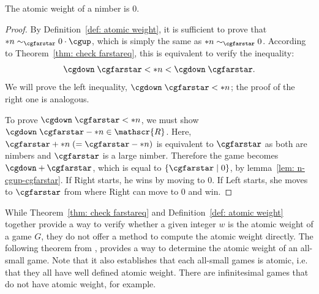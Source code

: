 \documentclass[oneside,reqno]{amsart}
\newcommand{\rp}{\mathscr{R}}
\newcommand{\cgfarstareq}[2]{{#1}\sim_{\cgfarstar}{#2}}
\begin{document}
    \begin{lemma}\label{lem: aw of nimbers}
        The atomic weight of a nimber is 0.
    \end{lemma}
    \begin{proof}
          By Definition~\ref{def: atomic weight}, it is sufficient to prove that $\cgfarstareq{*n}{0\cdot \cgup}$, which is simply the same as $\cgfarstareq{*n}{0}$. According to Theorem~\ref{thm: check farstareq}, this is equivalent to verify the inequality:
        \[
        \cgdown\;\cgfarstar < *n < \cgdown\;\cgfarstar.
        \]  We will prove the left inequality, $\cgdown\;\cgfarstar<*n$; the proof of the right one is analogous. 
        
        To prove $\cgdown\;\cgfarstar<*n$, we must show $\cgdown\;\cgfarstar-*n\in \rp$. Here, $\cgfarstar+*n\;(=\cgfarstar-*n)$ is equivalent to $\cgfarstar$ as both are nimbers and $\cgfarstar$ is a large nimber. Therefore the game becomes $\cgdown + \cgfarstar$, which is equal to $\{\cgfarstar\mid 0\}$, by lemma~\ref{lem: n-cgup-cgfarstar}. If Right starts, he wins by moving to 0. If Left starts, she moves to $\cgfarstar$ from where Right can move to 0 and win.
    \end{proof}

    
    While Theorem~\ref{thm: check farstareq} and Definition~\ref{def: atomic weight} together provide a way to verify whether a given integer $w$ is the atomic weight of a game $G$, they do not offer a method to compute the atomic weight directly. The following theorem from \cite{LiP}, provides a way to determine the atomic weight of an all-small game. Note that it also establishes that each all-small games is atomic, i.e. that they all have well defined atomic weight. There are infinitesimal games that do not have atomic weight, for example.
\end{document}
